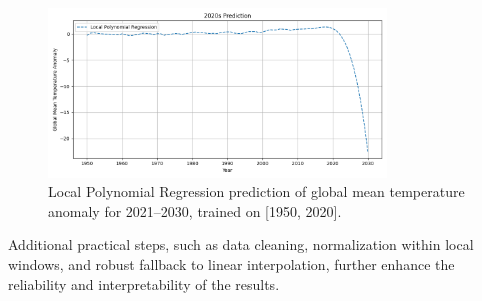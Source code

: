 \begin{figure}[htbp]
    \centering
    \includegraphics[width=0.8\textwidth]{../figs/2020s-prediction.png}
    \caption{Local Polynomial Regression prediction of global mean temperature anomaly for 2021--2030, trained on [1950, 2020].}
    \label{fig:future-prediction}
\end{figure}

Additional practical steps, such as data cleaning, normalization within local windows, and robust fallback to linear interpolation, further enhance the reliability and interpretability of the results.